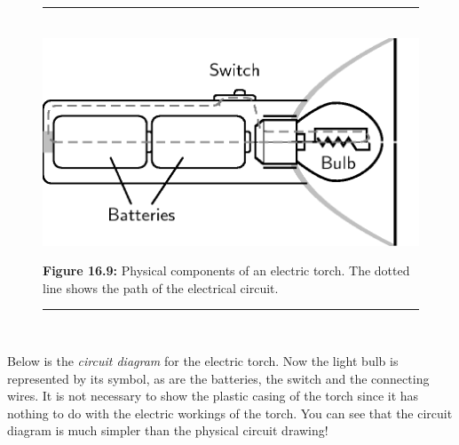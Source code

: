	\begin{figure}[H] %
    \begin{center}
    \rule[.1in]{\figurerulewidth}{.005in} \\
        \label{m38771*uid14!!!underscore!!!media}\label{m38771*uid14!!!underscore!!!printimage}\includegraphics{col11305.imgs/m38516_PG10C9_009.png} %
        
      \vspace{2pt}
    \vspace{\rubberspace}\par \begin{cnxcaption}
	  \small \textbf{Figure 16.9: }Physical components of an electric torch. The dotted line shows the path of the electrical circuit.
	\end{cnxcaption}
      
    \vspace{.1in}
    \rule[.1in]{\figurerulewidth}{.005in} \\
        
    \end{center}

 \end{figure}   

    \addtocounter{footnote}{-0}
    
          \label{m38771*id63252}Below is the \textsl{circuit diagram} for the electric torch. Now the light bulb is represented by its symbol, as are the batteries, the switch and the connecting wires. It is not necessary to show the plastic casing of the torch since it has nothing to do with the electric workings of the torch. You can see that the circuit diagram is much simpler than the physical circuit drawing!\par 
          
